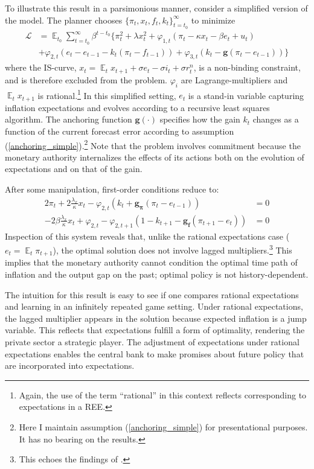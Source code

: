 \documentclass[11pt]{article}
\renewcommand{\[}{\begin{equation}}
\renewcommand{\]}{\end{equation}}
\DeclareMathOperator{\E}{\mathbb{E}}
\begin{document}
To illustrate this result in a parsimonious manner, consider a simplified version of the model. The planner chooses $\{\pi_t, x_t, f_t, k_t\}_{t=t_0}^{\infty}$ to minimize
 \begin{align*}
\mathcal{L} &= \E_{t_0}\sum_{t=t_0}^{\infty} \beta^{t-t_0}\bigg\{ \pi_t^2  + \lambda x_t^2 + \varphi_{1,t} (\pi_t -\kappa x_t- \beta e_t +u_t) \\ &+ \varphi_{2,t}(e_t - e_{t-1} -k_t(\pi_t - f_{t-1})) + \varphi_{3,t}(k_t - \mathbf{g}(\pi_t - e_{t-1})) \bigg\}
 \end{align*}
 where the IS-curve, $x_t = \E_t x_{t+1}+\sigma e_t -\sigma i_t +\sigma r_t^n$, is a non-binding constraint, and is therefore excluded from the problem. $\varphi_i$ are Lagrange-multipliers and $\E_t x_{t+1}$ is rational.\footnote{Again, the use of the term ``rational'' in this context reflects corresponding to expectations in a REE.} In this simplified setting, $e_t$ is a stand-in variable capturing inflation expectations and evolves according to a recursive least squares algorithm. The anchoring function $\mathbf{g}(\cdot)$ specifies how the gain $k_t$ changes as a function of the current forecast error according to assumption (\ref{anchoring_simple}).\footnote{Here I maintain assumption (\ref{anchoring_simple}) for presentational purposes. It has no bearing on the results.} Note that the problem involves commitment because the monetary authority internalizes the effects of its actions both on the evolution of expectations and on that of the gain. 
 
 After some manipulation, first-order conditions reduce to:
 \begin{align}
  2\pi_t +2\frac{\lambda_x}{\kappa}x_t -\varphi_{2,t}(k_t + \mathbf{g_{\pi}}(\pi_t -e_{t-1}))& = 0 \label{simpleFOC1} \\
  -2\beta\frac{\lambda_x}{\kappa}x_t + \varphi_{2,t} -\varphi_{2,t+1}(1-k_{t+1} -\mathbf{g_{f}}(\pi_{t+1} -e_{t})) & = 0 \label{simpleFOC2} 
 \end{align}
Inspection of this system reveals that, unlike the rational expectations case ($e_t = \E_t{\pi_{t+1}}$), the optimal solution does not involve lagged multipliers.\footnote{This echoes the findings of \cite{molnar2014optimal}.} This implies that the monetary authority cannot condition the optimal time path of inflation and the output gap on the past; optimal policy is not history-dependent. 

The intuition for this result is easy to see if one compares rational expectations and learning in an infinitely repeated game setting. Under rational expectations, the lagged multiplier appears in the solution because expected inflation is a jump variable. This reflects that expectations fulfill a form of optimality, rendering the private sector a strategic player. The adjustment of expectations under rational expectations enables the central bank to make promises about future policy that are incorporated into expectations. 
\end{document}
